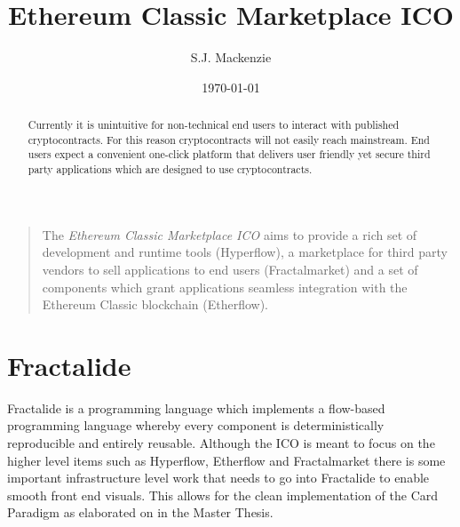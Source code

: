 \documentclass[%
 aip,
 jmp,%
 amsmath,amssymb,
 preprint,
 reprint,
 author-year,
 author-numerical,
]{revtex4-1}
\begin{document}

\title[Ethereum Classic Marketplace ICO]{Ethereum Classic Marketplace ICO}%


\author{S.J. Mackenzie}%

\date{\today}%

\begin{abstract}

Currently it is unintuitive for non-technical end users to interact with published cryptocontracts. For this reason cryptocontracts will not easily reach mainstream. End users expect a convenient one-click platform that delivers user friendly yet secure third party applications which are designed to use cryptocontracts.
\end{abstract}

\maketitle

\begin{quotation}
The \textit{Ethereum Classic Marketplace ICO} aims to provide a rich set of development and runtime tools (Hyperflow), a marketplace for third party vendors to sell applications to end users (Fractalmarket) and a set of components which grant applications seamless integration with the Ethereum Classic blockchain (Etherflow).

\end{quotation}

\section{\label{sec:fractalide}Fractalide}
Fractalide is a programming language which implements a flow-based programming language whereby every component is deterministically reproducible and entirely reusable. Although the ICO is meant to focus on the higher level items such as Hyperflow, Etherflow and Fractalmarket there is some important infrastructure level work that needs to go into Fractalide to enable smooth front end visuals. This allows for the clean implementation of the Card Paradigm as elaborated on in the Master Thesis.
\end{document}
